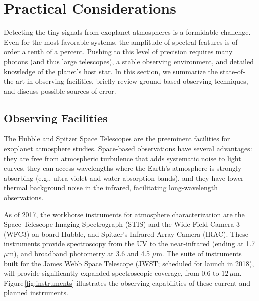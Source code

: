 \documentclass[graybox,natbib,nosecnum]{svmult}
\begin{document}

\section{Practical Considerations}
Detecting the tiny signals from exoplanet atmospheres is a formidable challenge. Even for the most favorable systems, the amplitude of spectral features is of order a tenth of a percent. Pushing to this level of precision requires many photons (and thus large telescopes), a stable observing environment, and detailed knowledge of the planet's host star.  In this section, we summarize the state-of-the-art in observing facilities, briefly review ground-based observing techniques, and discuss possible sources of error.

\subsection{Observing Facilities}
The Hubble and Spitzer Space Telescopes are the preeminent facilities for exoplanet atmosphere studies.  Space-based observations have several advantages: they are free from atmospheric turbulence that adds systematic noise to light curves, they can access wavelengths where the Earth's atmosphere is strongly absorbing (e.g., ultra-violet and water absorption bands), and they have lower thermal background noise in the infrared, facilitating long-wavelength observations. 

As of 2017, the workhorse instruments for atmosphere characterization are the Space Telescope Imaging Spectrograph (STIS) and the Wide Field Camera 3 (WFC3) on board Hubble, and Spitzer's Infrared Array Camera (IRAC).  These instruments provide spectroscopy from the UV to the near-infrared (ending at 1.7 $\mu$m), and broadband photometry at 3.6 and 4.5 $\mu$m. The suite of instruments built for the James Webb Space Telescope (JWST; scheduled for launch in 2018), will provide significantly expanded spectroscopic coverage, from $0.6$ to $12\,\mu$m.  Figure\,\ref{fig:instruments} illustrates the observing capabilities of these current and planned instruments. 
\end{document}
